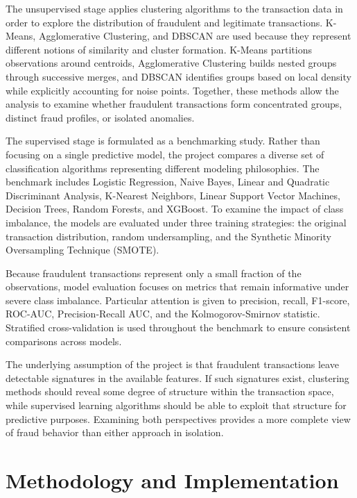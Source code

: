 \documentclass[
  12pt,
  letterpaper,
]{book}
\begin{document}
The unsupervised stage applies clustering algorithms to the transaction
data in order to explore the distribution of fraudulent and legitimate
transactions. K-Means, Agglomerative Clustering, and DBSCAN are used
because they represent different notions of similarity and cluster
formation. K-Means partitions observations around centroids,
Agglomerative Clustering builds nested groups through successive merges,
and DBSCAN identifies groups based on local density while explicitly
accounting for noise points. Together, these methods allow the analysis
to examine whether fraudulent transactions form concentrated groups,
distinct fraud profiles, or isolated anomalies.

The supervised stage is formulated as a benchmarking study. Rather than
focusing on a single predictive model, the project compares a diverse
set of classification algorithms representing different modeling
philosophies. The benchmark includes Logistic Regression, Naive Bayes,
Linear and Quadratic Discriminant Analysis, K-Nearest Neighbors, Linear
Support Vector Machines, Decision Trees, Random Forests, and XGBoost. To
examine the impact of class imbalance, the models are evaluated under
three training strategies: the original transaction distribution, random
undersampling, and the Synthetic Minority Oversampling Technique
(SMOTE).

Because fraudulent transactions represent only a small fraction of the
observations, model evaluation focuses on metrics that remain
informative under severe class imbalance. Particular attention is given
to precision, recall, F1-score, ROC-AUC, Precision-Recall AUC, and the
Kolmogorov-Smirnov statistic. Stratified cross-validation is used
throughout the benchmark to ensure consistent comparisons across models.

The underlying assumption of the project is that fraudulent transactions
leave detectable signatures in the available features. If such
signatures exist, clustering methods should reveal some degree of
structure within the transaction space, while supervised learning
algorithms should be able to exploit that structure for predictive
purposes. Examining both perspectives provides a more complete view of
fraud behavior than either approach in isolation.

\section{Methodology and
Implementation}\label{methodology-and-implementation-3}
\end{document}
